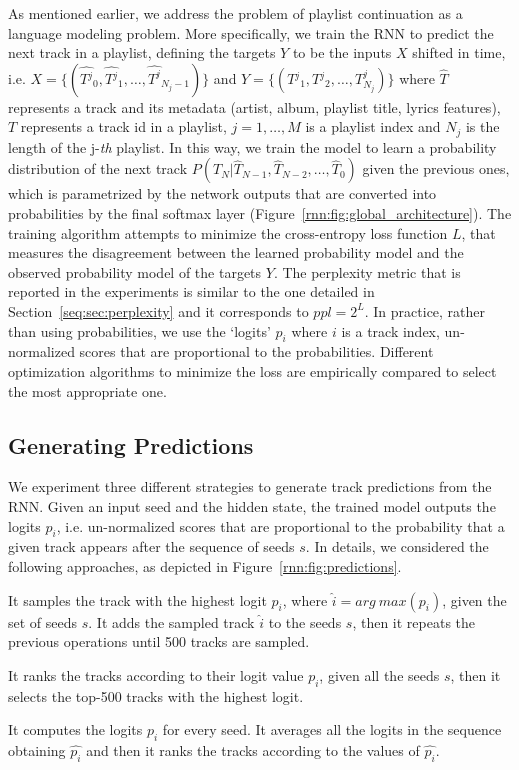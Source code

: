As mentioned earlier, we address the problem of playlist continuation as a language modeling problem. More specifically, we train the RNN to predict the next track in a playlist, defining the targets $Y$ to be the inputs $X$ shifted in time, i.e. $X = \{(\hat{T{^j}}_0, \hat{T{^j}}_1, \dots, \hat{T^{j}}_{N_j -1})\}$ and $Y = \{(T{^j}_1, T{^j}_2, \dots, T^{j}_{N_j})\}$ where $\hat{T}$ represents a track and its metadata (artist, album, playlist title, lyrics features), $T$ represents a track id in a playlist, $j = 1, \dots, M$ is a playlist index and $N_j$ is the length of the j-\textit{th} playlist. In this way, we train the model to learn a probability distribution of the next track $P (T_N | \hat{T}_{N-1}, \hat{T}_{N-2}, \dots, \hat{T}_{0})$ given the previous ones, which is parametrized by the network outputs that are converted into probabilities by the final softmax layer (Figure~\ref{rnn:fig:global_architecture}). The training algorithm attempts to minimize the cross-entropy loss function $L$, that measures the disagreement between the learned probability model and the observed probability model of the targets $Y$. The perplexity metric that is reported in the experiments is similar to the one detailed in Section~\ref{seq:sec:perplexity} and it corresponds to $ppl = 2^{L}$. In practice, rather than using probabilities, we use the `logits' $p_i$ where $i$ is a track index, un-normalized scores that are proportional to the probabilities. Different optimization algorithms to minimize the loss are empirically compared to select the most appropriate one.

\subsection{Generating Predictions}
\label{rnn:sec:generation}

We experiment three different strategies to generate track predictions from the RNN. Given an input seed and the hidden state, the trained model outputs the logits $p_i$, i.e. un-normalized scores that are proportional to the probability that a given track appears after the sequence of seeds $s$. In details, we considered the following approaches, as depicted in Figure~\ref{rnn:fig:predictions}.

\begin{description}[font=\tt]
\item[do\_sample] It samples the track with the highest logit $p_i$, where $\hat{i} = arg\ max ({p_i})$, given the set of seeds $s$. It adds the sampled track $\hat{i}$ to the seeds $s$, then it repeats the previous operations until 500 tracks are sampled.
\item[do\_rank] It ranks the tracks according to their logit value $p_i$, given all the seeds $s$, then it selects the top-500 tracks with the highest logit.
\item[do\_summed\_rank] It computes the logits $p_i$ for every seed. It averages all the logits in the sequence obtaining $\hat{p_i}$ and then it ranks the tracks according to the values of $\hat{p_i}$.
\end{description}

